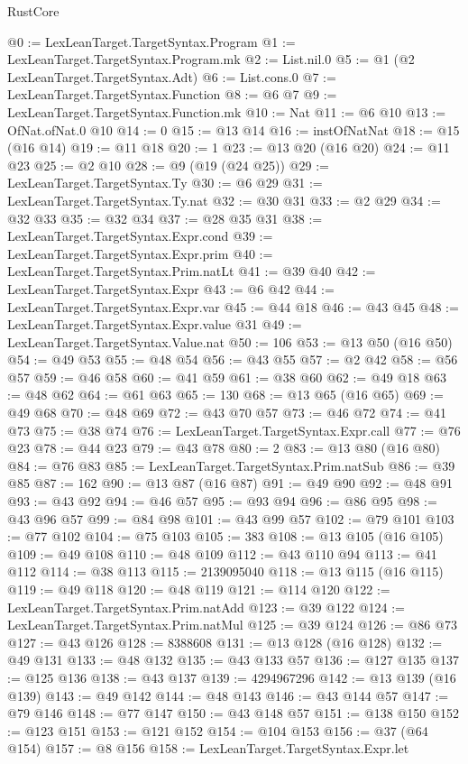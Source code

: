 \begin{lexlean}{RustCore}
\begin{coremodule}
@0 := LexLeanTarget.TargetSyntax.Program
@1 := LexLeanTarget.TargetSyntax.Program.mk
@2 := List.nil.{0}
@5 := @1 (@2 LexLeanTarget.TargetSyntax.Adt)
@6 := List.cons.{0}
@7 := LexLeanTarget.TargetSyntax.Function
@8 := @6 @7
@9 := LexLeanTarget.TargetSyntax.Function.mk
@10 := Nat
@11 := @6 @10
@13 := OfNat.ofNat.{0} @10
@14 := 0
@15 := @13 @14
@16 := instOfNatNat
@18 := @15 (@16 @14)
@19 := @11 @18
@20 := 1
@23 := @13 @20 (@16 @20)
@24 := @11 @23
@25 := @2 @10
@28 := @9 (@19 (@24 @25))
@29 := LexLeanTarget.TargetSyntax.Ty
@30 := @6 @29
@31 := LexLeanTarget.TargetSyntax.Ty.nat
@32 := @30 @31
@33 := @2 @29
@34 := @32 @33
@35 := @32 @34
@37 := @28 @35 @31
@38 := LexLeanTarget.TargetSyntax.Expr.cond
@39 := LexLeanTarget.TargetSyntax.Expr.prim
@40 := LexLeanTarget.TargetSyntax.Prim.natLt
@41 := @39 @40
@42 := LexLeanTarget.TargetSyntax.Expr
@43 := @6 @42
@44 := LexLeanTarget.TargetSyntax.Expr.var
@45 := @44 @18
@46 := @43 @45
@48 := LexLeanTarget.TargetSyntax.Expr.value @31
@49 := LexLeanTarget.TargetSyntax.Value.nat
@50 := 106
@53 := @13 @50 (@16 @50)
@54 := @49 @53
@55 := @48 @54
@56 := @43 @55
@57 := @2 @42
@58 := @56 @57
@59 := @46 @58
@60 := @41 @59
@61 := @38 @60
@62 := @49 @18
@63 := @48 @62
@64 := @61 @63
@65 := 130
@68 := @13 @65 (@16 @65)
@69 := @49 @68
@70 := @48 @69
@72 := @43 @70 @57
@73 := @46 @72
@74 := @41 @73
@75 := @38 @74
@76 := LexLeanTarget.TargetSyntax.Expr.call
@77 := @76 @23
@78 := @44 @23
@79 := @43 @78
@80 := 2
@83 := @13 @80 (@16 @80)
@84 := @76 @83
@85 := LexLeanTarget.TargetSyntax.Prim.natSub
@86 := @39 @85
@87 := 162
@90 := @13 @87 (@16 @87)
@91 := @49 @90
@92 := @48 @91
@93 := @43 @92
@94 := @46 @57
@95 := @93 @94
@96 := @86 @95
@98 := @43 @96 @57
@99 := @84 @98
@101 := @43 @99 @57
@102 := @79 @101
@103 := @77 @102
@104 := @75 @103
@105 := 383
@108 := @13 @105 (@16 @105)
@109 := @49 @108
@110 := @48 @109
@112 := @43 @110 @94
@113 := @41 @112
@114 := @38 @113
@115 := 2139095040
@118 := @13 @115 (@16 @115)
@119 := @49 @118
@120 := @48 @119
@121 := @114 @120
@122 := LexLeanTarget.TargetSyntax.Prim.natAdd
@123 := @39 @122
@124 := LexLeanTarget.TargetSyntax.Prim.natMul
@125 := @39 @124
@126 := @86 @73
@127 := @43 @126
@128 := 8388608
@131 := @13 @128 (@16 @128)
@132 := @49 @131
@133 := @48 @132
@135 := @43 @133 @57
@136 := @127 @135
@137 := @125 @136
@138 := @43 @137
@139 := 4294967296
@142 := @13 @139 (@16 @139)
@143 := @49 @142
@144 := @48 @143
@146 := @43 @144 @57
@147 := @79 @146
@148 := @77 @147
@150 := @43 @148 @57
@151 := @138 @150
@152 := @123 @151
@153 := @121 @152
@154 := @104 @153
@156 := @37 (@64 @154)
@157 := @8 @156
@158 := LexLeanTarget.TargetSyntax.Expr.let

\end{coremodule}
\end{lexlean}
